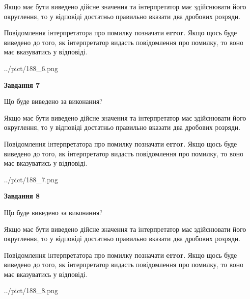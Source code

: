 \documentclass[12pt, ukrainian]{article}
\begin{document}
{\begin {Large}
Якщо має бути виведено дійсне значення та інтерпретатор має здійснювати його округлення, 
то у відповіді достатньо правильно вказати два дробових розряди.

Повідомлення інтерпретатора про помилку позначати \textbf{error}.
Якщо щось буде виведено до того, як інтерпретатор видасть повідомлення про помилку, 
то воно має вказуватись у відповіді. \par

\begin{center}
	{../pict/188_6.png}
\end{center}
\newpage

{\begin {center}\textbf{Завдання 7}\end {center}}\par
Що буде виведено за виконання? \par

Якщо має бути виведено дійсне значення та інтерпретатор має здійснювати його округлення, 
то у відповіді достатньо правильно вказати два дробових розряди.

Повідомлення інтерпретатора про помилку позначати \textbf{error}.
Якщо щось буде виведено до того, як інтерпретатор видасть повідомлення про помилку, 
то воно має вказуватись у відповіді. \par

\begin{center}
	{../pict/188_7.png}
\end{center}
\newpage

{\begin {center}\textbf{Завдання 8}\end {center}}\par
Що буде виведено за виконання? \par

Якщо має бути виведено дійсне значення та інтерпретатор має здійснювати його округлення, 
то у відповіді достатньо правильно вказати два дробових розряди.

Повідомлення інтерпретатора про помилку позначати \textbf{error}.
Якщо щось буде виведено до того, як інтерпретатор видасть повідомлення про помилку, 
то воно має вказуватись у відповіді. \par

\begin{center}
	{../pict/188_8.png}
\end{center}
\newpage


\end{Large}}
\end{document}
